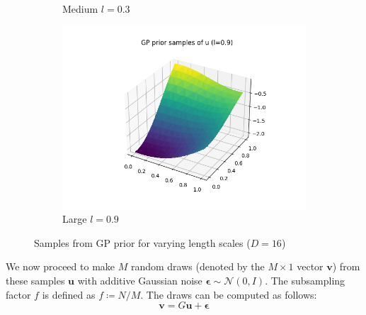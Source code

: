 \documentclass[]{article}
\newcommand{\Ncal}{\mathcal{N}}
\newcommand{\ubold}{\boldsymbol{u}}
\newcommand{\vbold}{\boldsymbol{v}}
\newcommand{\epsbold}{\boldsymbol{\epsilon}}
\begin{document}
\begin{figure}[!h]
\begin{subfigure}{0.32\linewidth}
		\caption{Medium $l=0.3$}
	\end{subfigure}
	\begin{subfigure}{0.32\linewidth}
		\includegraphics[width=\linewidth]{u-big.png}
		\caption{Large $l=0.9$}
	\end{subfigure}
	\caption{Samples from GP prior for varying length scales ($D=16$)}
	\label{fig:l-effect}
\end{figure}

We now proceed to make $M$ random draws (denoted by the $M \times 1$ vector $\vbold$) from these samples $\ubold$ with additive Gaussian noise $\epsbold \sim \Ncal(0, I)$. The subsampling factor $f$ is defined as $f \coloneqq N / M$. The draws can be computed as follows:
%
\begin{equation}
	\vbold = G \ubold + \epsbold
	\label{eqn:v-defn}
\end{equation}
\end{document}
